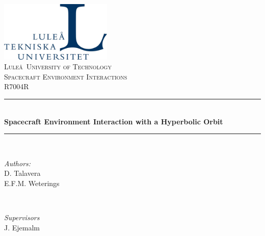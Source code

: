 
\begin{titlepage} %
	\center %
	\newcommand{\HRule}{\rule{\linewidth}{0.5mm}} %
	
	
	\includegraphics[width=0.4\textwidth, trim=0 0 0 -2cm]{figures/LTU_logo.jpg}\\[1cm]
		
	
	\textsc{\Huge Lule\aa \ University of Technology}\\[1.5cm]
	
	\textsc{\LARGE Spacecraft Environment Interactions}\\[0.3cm]
	
	\textsc{\large R7004R}\\[0.5cm]
	
	
	\HRule\\[0.4cm]
	
	{\Huge\bfseries Spacecraft Environment Interaction with a Hyperbolic Orbit}\\[0.4cm]
	
	\HRule\\[1.5cm]
	
	
	\begin{minipage}{0.4\textwidth}
		\begin{flushleft}
			\large
			\textit{Authors:}\\
			D. Talavera\\
			E.F.M. Weterings
		\end{flushleft}
	\end{minipage}
	~
	\begin{minipage}{0.4\textwidth}
		\begin{flushright}
			\large
			\textit{Supervisors}\\
			J. Ejemalm\\
		\end{flushright}
	\end{minipage}
	

\end{titlepage}
